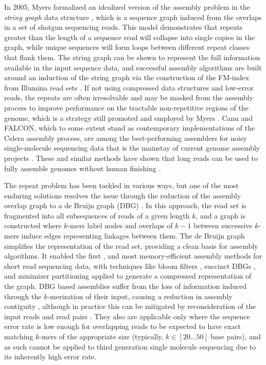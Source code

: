 In 2005, Myers formalized an idealized version of the assembly problem in the \emph{string graph} data structure \cite{myers2005}, which is a sequence graph induced from the overlaps in a set of shotgun sequencing reads.
This model demonstrates that repeats greater than the length of a sequence read will collapse into single copies in the graph, while unique sequences will form loops between different repeat classes that flank them.
The string graph can be shown to represent the full information available in the input sequence data, and successful assembly algorithms are built around an induction of the string graph via the construction of the FM-index \cite{ferragina2001experimental} from Illumina read sets \cite{simpson2010,simpson2012efficient,li2015fermikit}.
If not using compressed data structures and low-error reads, the repeats are often irresolvable and may be masked from the assembly process to improve performance on the tractable non-repetitive regions of the genome, which is a strategy still promoted and employed by Myers \cite{myers2014efficient}.
Canu and FALCON, which to some extent stand as contemporary implementations of the Celera assembly process, are among the best-performing assemblers for noisy single-molecule sequencing data that is the mainstay of current genome assembly projects \cite{chin2016phased,koren2017canu}.
These and similar methods have shown that long reads can be used to fully assemble genomes without human finishing \cite{loman2015complete,jain2018nanopore}.

The repeat problem has been tackled in various ways, but one of the most enduring solutions resolves the issue through the reduction of the assembly overlap graph to a de Bruijn graph (DBG) \cite{pevzner2001eulerian}.
In this approach, the read set is fragmented into all subsequences of reads of a given length $k$, and a graph is constructed where $k$-mers label nodes and overlaps of $k-1$ between successive $k$-mers induce edges representing linkages between them.
The de Bruijn graph simplifies the representation of the read set, providing a clean basis for assembly algorithms.
It enabled the first \cite{zerbino2008velvet,simpson2009abyss,iqbal2012novo}, and most memory-efficient assembly methods for short read sequencing data, with techniques like bloom filters \cite{chikhi2013space}, succinct DBGs \cite{bowe2012succinct,li2015megahit}, and minimizer partitioning \cite{chikhi2016compacting} applied to generate a compressed representation of the graph.
DBG based assemblies suffer from the loss of information induced through the $k$-merization of their input, causing a reduction in assembly contiguity \cite{earl2011assemblathon}, although in practice this can be mitigated by reconsideration of the input reads and read pairs \cite{butler2008allpaths}.
They also are applicable only where the sequence error rate is low enough for overlapping reads to be expected to have exact matching $k$-mers of the appropriate size (typically, $k \in [20 \ldots 50]$ base pairs), and as such cannot be applied to third generation single molecule sequencing due to its inherently high error rate.

